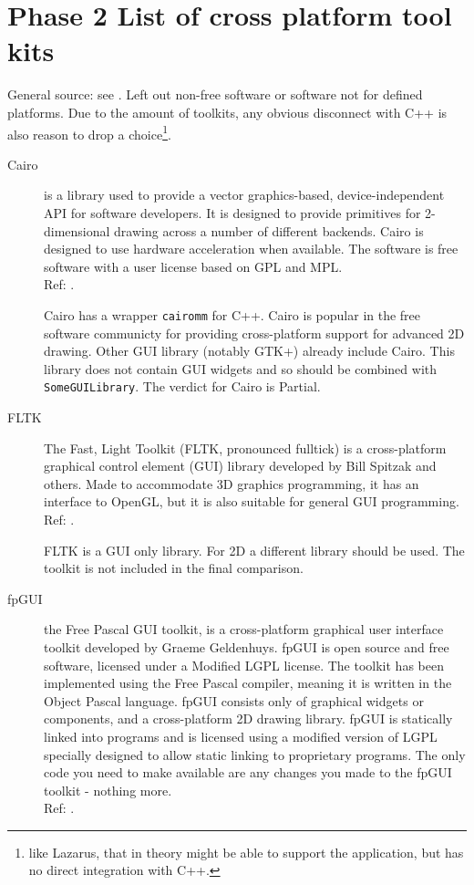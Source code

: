 \section{Phase 2 List of cross platform tool kits}
\label{sec:phase2-listing}

General source: see \cite{wiki:xplatf}. Left out non-free software or software
not for defined platforms. Due to the amount of toolkits, any obvious
disconnect with C++ is also reason to drop a choice\footnote{like Lazarus, that
in theory might be able to support the application, but has no direct
integration with C++.}.

\begin{description}
    \item[Cairo] is a library used to provide a vector graphics-based,
		device-independent API for software developers. It is designed
		to provide primitives for 2-dimensional drawing across a number
		of different backends. Cairo is designed to use hardware
		acceleration when available.
		The software is free software with a user license based on GPL
		and MPL.
		\hspace*{\fill}\\Ref: \cite{wiki:cairo}.

		Cairo has a wrapper \verb!cairomm! for C++.  Cairo is popular in the
		free software communicty for providing cross-platform support for
		advanced 2D drawing. Other GUI library (notably GTK+) already include
		Cairo. This library does not contain GUI widgets and so should be
		combined with \verb!SomeGUILibrary!. The verdict for Cairo is Partial.

    \item[FLTK] The Fast, Light Toolkit (FLTK, pronounced fulltick) is a
		cross-platform graphical control element (GUI)
		library developed by Bill Spitzak and others. Made to
		accommodate 3D graphics programming, it has an interface to
		OpenGL, but it is also suitable for general GUI programming.
		\hspace*{\fill}\\Ref: \cite{wiki:fltk}.

		FLTK is a GUI only library. For 2D a different library should be used.
		The toolkit is not included in the final comparison.

    \item[fpGUI] the Free Pascal GUI toolkit, is a cross-platform
		graphical user interface toolkit developed by Graeme Geldenhuys.
		fpGUI is open source and free software, licensed under a Modified LGPL
		license. The toolkit has been implemented using the Free Pascal
		compiler, meaning it is written in the Object Pascal language.
		fpGUI consists only of graphical widgets or components, and a
		cross-platform 2D drawing library.
		fpGUI is statically linked into programs and is licensed using a
		modified version of LGPL specially designed to allow static linking to
		proprietary programs. The only code you need to make available are
		any changes you made to the fpGUI toolkit - nothing more.
		\hspace*{\fill}\\Ref: \cite{wiki:fpgui}.


\end{description}

